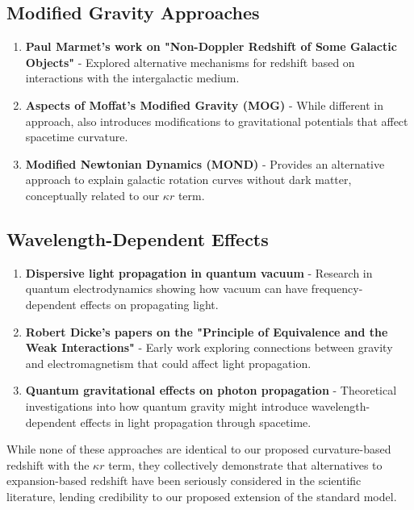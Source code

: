 \documentclass[12pt,a4paper]{article}
\begin{document}
	\subsection{Modified Gravity Approaches}
	\label{subsec:modified_gravity_lit}
	
	\begin{enumerate}
		\item \textbf{Paul Marmet's work on "Non-Doppler Redshift of Some Galactic Objects"}\cite{marmet1988} - Explored alternative mechanisms for redshift based on interactions with the intergalactic medium.
		
		\item \textbf{Aspects of Moffat's Modified Gravity (MOG)}\cite{moffat2006} - While different in approach, also introduces modifications to gravitational potentials that affect spacetime curvature.
		
		\item \textbf{Modified Newtonian Dynamics (MOND)}\cite{milgrom1983} - Provides an alternative approach to explain galactic rotation curves without dark matter, conceptually related to our $\kappa r$ term.
	\end{enumerate}
	
	\subsection{Wavelength-Dependent Effects}
	\label{subsec:wavelength_effects}
	
	\begin{enumerate}
		\item \textbf{Dispersive light propagation in quantum vacuum}\cite{drummond1980} - Research in quantum electrodynamics showing how vacuum can have frequency-dependent effects on propagating light.
		
		\item \textbf{Robert Dicke's papers on the "Principle of Equivalence and the Weak Interactions"}\cite{dicke1957} - Early work exploring connections between gravity and electromagnetism that could affect light propagation.
		
		\item \textbf{Quantum gravitational effects on photon propagation}\cite{amelino2009} - Theoretical investigations into how quantum gravity might introduce wavelength-dependent effects in light propagation through spacetime.
	\end{enumerate}
	
	While none of these approaches are identical to our proposed curvature-based redshift with the $\kappa r$ term, they collectively demonstrate that alternatives to expansion-based redshift have been seriously considered in the scientific literature, lending credibility to our proposed extension of the standard model.
	
\end{document}
